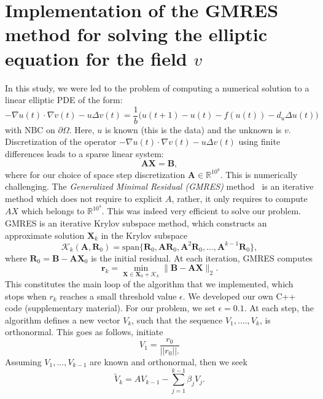 \documentclass[final,1p,times]{elsarticle}
\begin{document}
\section{Implementation of the GMRES method for solving the elliptic equation for the field $v$}
In this study, we were led to the problem of computing a numerical solution to a linear elliptic PDE of the form:
\begin{equation*}
-\nabla u(t)\cdot \nabla v(t)-u\Delta v(t)=\frac{1}{b}\Big( u(t+1)-u(t)-f(u(t))-d_u\Delta u(t) \Big)     
\end{equation*}
with NBC on $\partial \Omega$. Here, $u$ is known (this is the data) and the unknown is $v$. Discretization of the operator $-\nabla u(t)\cdot \nabla v(t)-u\Delta v(t)$ using finite differences leads  to a sparse linear system:
\begin{equation}
\mathbf{A} \mathbf{X} = \mathbf{B},
\end{equation}
where for our choice of space step discretization $\mathbf{A} \in \mathbb{R}^{10^8}$. This is numerically challenging. The \emph{Generalized Minimal Residual (GMRES)} method~\cite{SaadSchultz1986} is an iterative method which does not require to explicit $A$, rather, it only requires to compute $AX$ which belongs to $\mathbb{R}^{10^4}$. This was indeed very efficient to solve our problem. GMRES is an iterative Krylov subspace method, which constructs an approximate solution $\mathbf{X}_k$ in the Krylov subspace
\begin{equation}
\mathcal{K}_k(\mathbf{A}, \mathbf{R}_0) = \text{span}\{\mathbf{R}_0, \mathbf{A} \mathbf{R}_0, \mathbf{A}^2 \mathbf{R}_0, \dots, \mathbf{A}^{k-1} \mathbf{R}_0\},
\end{equation}
where $\mathbf{R}_0 = \mathbf{B} - \mathbf{A} \mathbf{X}_0$ is the initial residual. At each iteration, GMRES computes
\begin{equation}
\mathbf{r}_k = \min_{\mathbf{X} \in \mathbf{X}_0 + \mathcal{K}_k} \| \mathbf{B} - \mathbf{A}\mathbf{X} \|_2.
\end{equation}
This constitutes the main loop of the algorithm that we implemented, which stops when $r_k$ reaches a small threshold value $\epsilon$.
We developed our own C++ code (supplementary material). For our problem, we set $\epsilon=0.1$.
At each step, the algorithm defines a new vector $V_k$, such that the  sequence $V_1,....,V_k$, is orthonormal. This goes as follows, initiate
\[V_1=\frac{r_0}{||r_0||.}\]
Assuming $V_1,...,V_{k-1}$ are known and orthonormal, then we seek
\[\tilde{V}_k=AV_{k-1}-\sum_{j=1}^{k-1}\beta_jV_j.\]
\end{document}
